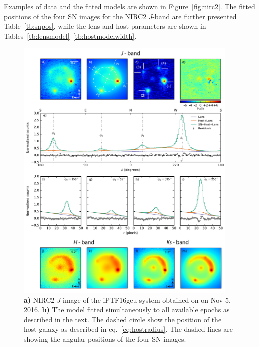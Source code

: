 \documentclass[a4paper,fleqn,usenatbib]{mnras}
\newcommand{\geu}{iPTF16geu\xspace}
\newcommand{\sn}{SN\xspace}
\newcommand{\jband}{{\it J}\xspace}
\begin{document}
Examples of data and the fitted models are shown in Figure~\ref{fig:nirc2}.  The fitted positions of the four \sn
images for the NIRC2 \jband-band are further presented Table~\ref{tb:snpos}, while the lens and host parameters are shown 
in Tables~\ref{tb:lensmodel}--\ref{tb:hostmodelwidth}. 

\begin{figure}
	\centering
	\includegraphics[width=0.95\textwidth]{forward_nirc2_v2.pdf}
	\caption{%
		{\bf a)} NIRC2 \jband image of the \geu system obtained on on Nov 5, 2016. 
		{\bf b)} The model fitted simultaneously to all available epochs as described in the text.  The dashed circle show the 
		position of the host galaxy as described in eq.~\eqref{eq:hostradius}.  The dashed lines are showing the angular 
		positions of the four \sn images. 
}
\end{figure}
\end{document}
